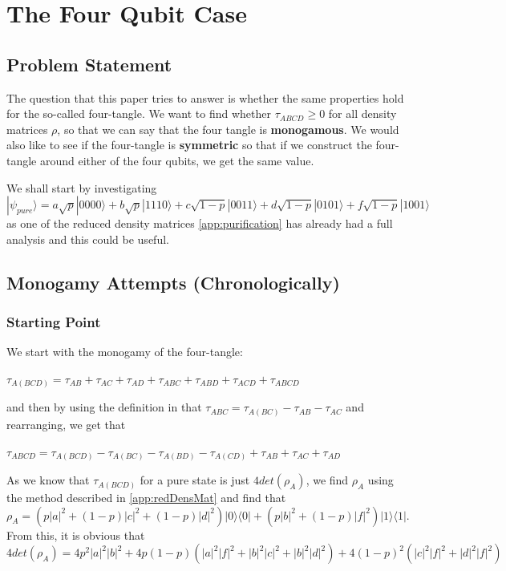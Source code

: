 \documentclass[12pt,a4paper]{article}
\numberwithin{equation}{section}
\begin{document}
\section{The Four Qubit Case}
\label{sec:fourQubits}

\subsection{Problem Statement}
\label{subsec:fourStatement}

The question that this paper tries to answer is whether the same properties hold for the so-called four-tangle. We want to find whether $\tau_{ABCD} \geq 0$ for all density matrices $\rho$, so that we can say that the four tangle is {\bf monogamous}. We would also like to see if the four-tangle is {\bf symmetric} so that if we construct the four-tangle around either of the four qubits, we get the same value.

We shall start by investigating $|\psi_{pure}\rangle = a\sqrt{p}|0000\rangle + b\sqrt{p}|1110\rangle + c\sqrt{1-p}|0011\rangle + d\sqrt{1-p}|0101\rangle + f\sqrt{1-p}|1001\rangle$ as one of the reduced density matrices \ref{app:purification} has already had a full analysis and this could be useful.


\subsection{Monogamy Attempts (Chronologically)}
\label{subsec:fourMonogamy}

\subsubsection{Starting Point}
\label{subsubsec:fourStart}

We start with the monogamy of the four-tangle:

$\tau_{A(BCD)} = \tau_{AB} + \tau_{AC} + \tau_{AD} + \tau_{ABC} + \tau_{ABD} + \tau_{ACD} + \tau_{ABCD}$

\noindent and then by using the definition in \cite{CKW} that $\tau_{ABC} = \tau_{A(BC)} - \tau_{AB} - \tau_{AC}$ and rearranging, we get that

$\tau_{ABCD} = \tau_{A(BCD)} - \tau_{A(BC)} - \tau_{A(BD)} - \tau_{A(CD)} + \tau_{AB} + \tau_{AC} + \tau_{AD}$

\vskip 2mm

As we know that $\tau_{A(BCD)}$ for a pure state is just $4det(\rho_{A})$, we find $\rho_{A}$ using the method described in \ref{app:redDensMat} and find that $\rho_{A} = (p|a|^2 + (1-p)|c|^2 + (1-p)|d|^2)|0\rangle\langle0| + (p|b|^2 + (1-p)|f|^2)|1\rangle\langle1|$. From this, it is obvious that $4det(\rho_{A}) = 4p^2|a|^2|b|^2 + 4p(1-p)(|a|^2|f|^2+|b|^2|c|^2+|b|^2|d|^2) + 4(1-p)^2(|c|^2|f|^2+|d|^2|f|^2)$
\end{document}
